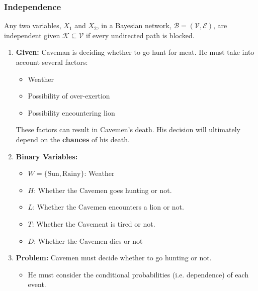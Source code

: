 \subsubsection{Independence}
\begin{theorem}
    Any two variables, $X_1$ and $X_2$, in a Bayesian network, $\mathcal{B} = (\mathcal{V}, \mathcal{E})$, are independent given $\mathcal{K} \subseteq \mathcal{V}$ if every undirected path is blocked.
\end{theorem}
\newpage

\begin{example}
    \begin{enumerate}
        \item \textbf{Given:} Caveman is deciding whether to go hunt for meat. He must take into account several factors:
        \begin{itemize}
            \item Weather
            \item Possibility of over-exertion
            \item Possibility encountering lion
        \end{itemize}

        These factors can result in Cavemen's death. His decision will ultimately depend on the \textbf{chances} of his death.
        \item \textbf{Binary Variables:}
        \begin{itemize}
            \item $W = \{\text{Sun}, \text{Rainy}\}$: Weather
            \item $H$: Whether the Cavemen goes hunting or not.
            \item $L$: Whether the Cavemen encounters a lion or not.
            \item $T$: Whether the Cavement is tired or not.
            \item $D$: Whether the Cavemen dies or not
        \end{itemize}
        \item \textbf{Problem:} Cavemen must decide whether to go hunting or not. 
        \begin{itemize}
            \item He must consider the conditional probabilities (i.e. dependence) of each event.
        \end{itemize}
    \end{enumerate}
\end{example}

